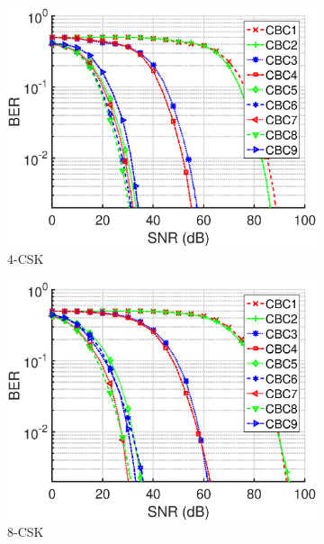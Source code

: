 \documentclass[10pt,letterpaper]{article}
\begin{document}
\begin{figure}[t]
	\centering
		\begin{subfigure}{0.32\textwidth}
		\centering
			\includegraphics[trim={0.1in 0.0in 0.5in 0.3in}, clip=true, width=\textwidth]{M04_4-CSK_BERvsSNR_NL.eps}
			\caption{4-CSK}
			\label{fig4SNR_NL}
		\end{subfigure}
		\begin{subfigure}{0.32\textwidth}
		\centering
			\includegraphics[trim={0.1in 0.0in 0.5in 0.3in}, clip=true, width=\textwidth]{M08_8-CSK_BERvsSNR_NL.eps}
			\caption{8-CSK}
			\label{fig8SNR_NL}
		\end{subfigure}
		\begin{subfigure}{0.32\textwidth}

\end{subfigure}
\end{figure}
\end{document}

